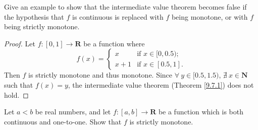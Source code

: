 \begin{exercise}\label{ex 9.8.2}
    Give an example to show that the intermediate value theorem becomes false if the hypothesis that \(f\) is continuous is replaced with \(f\) being monotone, or with \(f\) being strictly monotone.
\end{exercise}

\begin{proof}
    Let \(f : [0, 1] \to \mathbf{R}\) be a function where
    \[
        f(x) = \begin{cases}
            x     & \text{if } x \in [0, 0.5); \\
            x + 1 & \text{if } x \in [0.5, 1].
        \end{cases}
    \]
    Then \(f\) is strictly monotone and thus monotone.
    Since \(\forall\ y \in [0.5, 1.5)\), \(\nexists\ x \in \mathbf{N}\) such that \(f(x) = y\), the intermediate value theorem (Theorem \ref{9.7.1}) does not hold.
\end{proof}

\begin{exercise}\label{ex 9.8.3}
    Let \(a < b\) be real numbers, and let \(f : [a, b] \to \mathbf{R}\) be a function which is both continuous and one-to-one.
    Show that \(f\) is strictly monotone.
\end{exercise}

